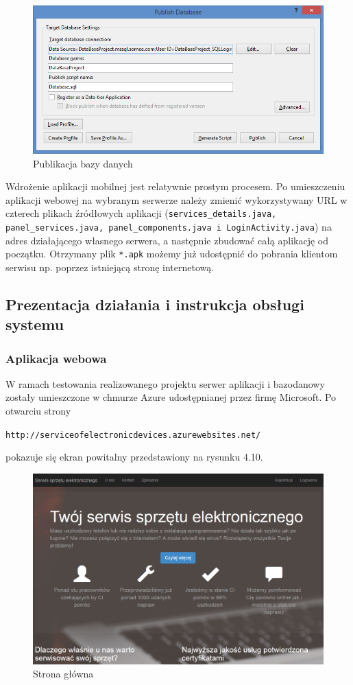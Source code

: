 \documentclass[a4paper,11pt]{article}
\begin{document}
\begin{figure}[h!]
	\centering
	\includegraphics[width=\textwidth,height=0.6\textheight]{db4.png}
	\caption{Publikacja bazy danych}
\end{figure}

Wdrożenie aplikacji mobilnej jest relatywnie prostym procesem. Po umieszczeniu aplikacji webowej na wybranym serwerze należy zmienić wykorzystywany URL w czterech plikach źródłowych aplikacji (\texttt{services\_details.java, panel\_services.java, panel\_components.java i LoginActivity.java}) na adres działającego własnego serwera, a następnie zbudować całą aplikację od początku. Otrzymany plik \texttt{*.apk} możemy już udostępnić do pobrania klientom serwisu np. poprzez istniejącą stronę internetową.
\subsection{Prezentacja działania i instrukcja obsługi systemu}
\subsubsection{Aplikacja webowa}
W ramach testowania realizowanego projektu serwer aplikacji i bazodanowy zostały umieszczone w chmurze Azure udostępnianej przez firmę Microsoft. Po otwarciu strony
\begin{center}
	\texttt{http://serviceofelectronicdevices.azurewebsites.net/}
\end{center} pokazuje się ekran powitalny przedstawiony na rysunku 4.10.

\begin{figure}[h!]
	\centering
	\includegraphics[width=\textwidth,height=0.6\textheight]{serwisGlowna.png}
	\caption{Strona główna}
\end{figure}
\end{document}
